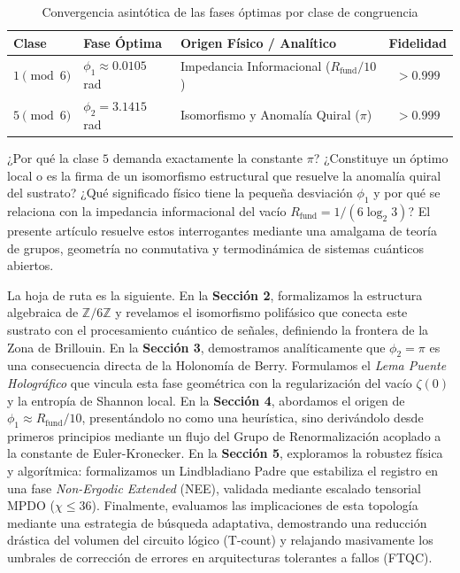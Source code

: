 \documentclass[12pt,a4paper]{article}
\theoremstyle{plain}
\theoremstyle{definition}
\theoremstyle{remark}
\begin{document}
\begin{table}[H]
\centering
\caption{Convergencia asintótica de las fases óptimas por clase de congruencia}
\label{tab:fases}
\begin{tabular}{lllc}
\toprule
\textbf{Clase} & \textbf{Fase Óptima} & \textbf{Origen Físico / Analítico} & \textbf{Fidelidad} \\
\midrule
$1 \pmod 6$ & $\phi_1 \approx 0.0105$ rad & Impedancia Informacional ($R_{\text{fund}}/10$) & $> 0.999$ \\
$5 \pmod 6$ & $\phi_2 = 3.1415$ rad & Isomorfismo y Anomalía Quiral ($\pi$) & $> 0.999$ \\
\bottomrule
\end{tabular}
\end{table}

¿Por qué la clase $5$ demanda exactamente la constante $\pi$? ¿Constituye un óptimo local o es la firma de un isomorfismo estructural que resuelve la anomalía quiral del sustrato? ¿Qué significado físico tiene la pequeña desviación $\phi_1$ y por qué se relaciona con la impedancia informacional del vacío $R_{\text{fund}} = 1/(6\log_2 3)$? El presente artículo resuelve estos interrogantes mediante una amalgama de teoría de grupos, geometría no conmutativa y termodinámica de sistemas cuánticos abiertos.

La hoja de ruta es la siguiente. En la \textbf{Sección 2}, formalizamos la estructura algebraica de $\mathbb{Z}/6\mathbb{Z}$ y revelamos el isomorfismo polifásico que conecta este sustrato con el procesamiento cuántico de señales, definiendo la frontera de la Zona de Brillouin. En la \textbf{Sección 3}, demostramos analíticamente que $\phi_2 = \pi$ es una consecuencia directa de la Holonomía de Berry. Formulamos el \textit{Lema Puente Holográfico} que vincula esta fase geométrica con la regularización del vacío $\zeta(0)$ y la entropía de Shannon local. En la \textbf{Sección 4}, abordamos el origen de $\phi_1 \approx R_{\text{fund}}/10$, presentándolo no como una heurística, sino derivándolo desde primeros principios mediante un flujo del Grupo de Renormalización acoplado a la constante de Euler-Kronecker. En la \textbf{Sección 5}, exploramos la robustez física y algorítmica: formalizamos un Lindbladiano Padre que estabiliza el registro en una fase \textit{Non-Ergodic Extended} (NEE), validada mediante escalado tensorial MPDO ($\chi \le 36$). Finalmente, evaluamos las implicaciones de esta topología mediante una estrategia de búsqueda adaptativa, demostrando una reducción drástica del volumen del circuito lógico (T-count) y relajando masivamente los umbrales de corrección de errores en arquitecturas tolerantes a fallos (FTQC).
\end{document}
